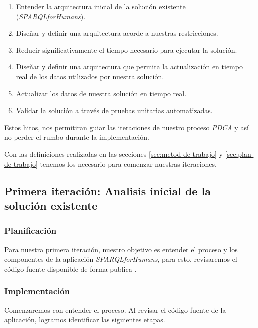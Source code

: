 \begin{enumerate}
    \item Entender la arquitectura inicial de la solución existente (\textit{SPARQLforHumans}).
    \item Diseñar y definir una arquitectura acorde a nuestras restricciones.
    \item Reducir significativamente el tiempo necesario para ejecutar la solución.
    \item Diseñar y definir una arquitectura que permita la actualización en tiempo real de los datos utilizados por nuestra solución.
    \item Actualizar los datos de nuestra solución en tiempo real.
    \item Validar la solución a través de pruebas unitarias automatizadas.
\end{enumerate}

Estos hitos, nos permitiran guiar las iteraciones de nuestro proceso \textit{PDCA} y así no perder el rumbo durante la implementación.

Con las definiciones realizadas en las secciones \ref{sec:metod-de-trabajo} y \ref{sec:plan-de-trabajo} tenemos los necesario para comenzar nuestras iteraciones.

\subsection{Primera iteración: Analisis inicial de la solución existente}

\subsubsection*{Planificación}

Para nuestra primera iteración, nuestro objetivo es entender el proceso y los componentes de la aplicación \textit{SPARQLforHumans}, para esto, revisaremos el código fuente disponible de forma publica \cite{parra2020autocompletion}.

\subsubsection*{Implementación}

Comenzaremos con entender el proceso. Al revisar el código fuente de la aplicación, logramos identificar las siguientes etapas.

